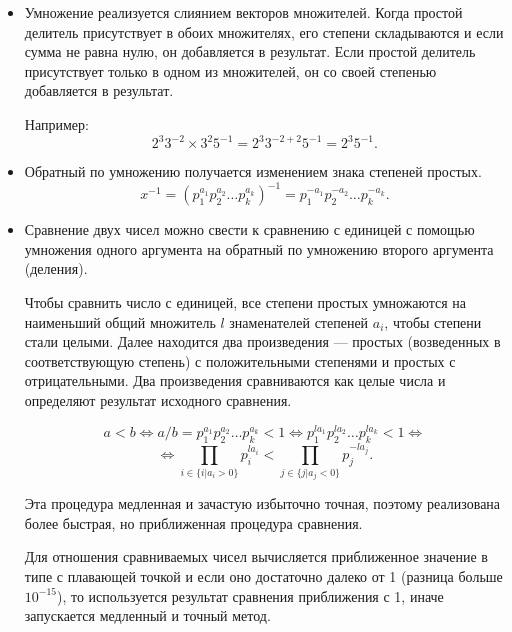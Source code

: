 \documentclass[specialist, substylefile = spbureport.rtx,
               subf,href,colorlinks=true, 12pt]{disser}
\begin{document}
    \begin{itemize}
        \item Умножение реализуется слиянием векторов множителей. Когда простой делитель присутствует в обоих множителях, его степени складываются и если сумма не равна нулю, он добавляется в результат. Если простой делитель присутствует только в одном из множителей, он со своей степенью добавляется в результат.
        
        Например:
        $$ 2^3 3^{-2} \times 3^2 5^{-1} = 2^3 3^{-2+2} 5^{-1} =  2^3 5^{-1}.$$

        \item Обратный по умножению получается изменением знака степеней простых.
        $$ x^{-1} = (p_1^{a_1}p_2^{a_2}\dots p_k^{a_k})^{-1} = p_1^{-a_1}p_2^{-a_2}\dots p_k^{-a_k}.$$

        \item Сравнение двух чисел можно свести к сравнению с единицей с помощью умножения одного аргумента на обратный по умножению второго аргумента (деления).

        Чтобы сравнить число с единицей, все степени простых умножаются на наименьший общий множитель $l$ знаменателей степеней $a_i$, чтобы степени стали целыми. Далее находится два произведения --- простых (возведенных в соответствующую степень) с положительными степенями и простых с отрицательными. Два произведения сравниваются как целые числа и определяют результат исходного сравнения.

        $$a < b \Leftrightarrow a/b = p_1^{a_1}p_2^{a_2}\dots p_k^{a_k} < 1 \Leftrightarrow 
        p_1^{l a_1}p_2^{l a_2}\dots p_k^{l a_k} < 1 \Leftrightarrow $$
        $$\Leftrightarrow
        \prod_{i \in \{i | a_i > 0\}} p_i^{l a_i} < \prod_{j \in \{j | a_j < 0\}} p_j^{-l a_j}.
        $$

        Эта процедура медленная и зачастую избыточно точная, поэтому реализована более быстрая, но приближенная процедура сравнения.
        
        Для отношения сравниваемых чисел вычисляется приближенное значение в типе с плавающей точкой и если оно достаточно далеко от 1 (разница больше $10^{-15}$), то используется результат сравнения приближения с 1, иначе запускается медленный и точный метод.
    \end{itemize}


    
\end{document}
